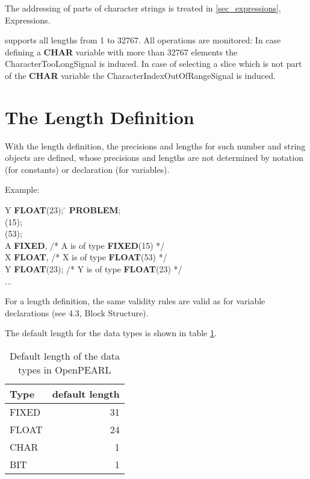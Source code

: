 The addressing of parts of character strings is treated in
 \ref{sec_expressions}, Expressions.

\OpenPEARL{} supports all lengths from 1 to 32767.
All operations are monitored:
In case defining a {\bf CHAR} variable with more than 32767 elements the
CharacterTooLongSignal is induced.
In case of selecting a slice which is not part of the {\bf CHAR} variable the 
CharacterIndexOutOfRangeSignal is induced.

\section{The Length Definition}   %
\label{sec_length}

With the length definition, the precisions and lengths for such
number and string objects are defined, whose precisions and lengths are
not determined by notation (for constants) or declaration (for
variables).


Example:

\begin{tabbing}
\x \x Y {\bf FLOAT}(23); \x \= \kill
{\bf PROBLEM}; \> \\
(15); \> \\
(53); \> \\
 A {\bf FIXED}, \> /* A is of type {\bf FIXED}(15) */ \\
\x \x X {\bf FLOAT},        \> /* X is of type {\bf FLOAT}(53) */ \\
\x \x Y {\bf FLOAT}(23);    \> /* Y is of type {\bf FLOAT}(23) */ \\
\x ... \> \\
\end{tabbing}

For a length definition, the same validity rules are valid as for
variable declarations (see 4.3, Block Structure).

The default length for the data types is shown in table \ref{tab_default_length}.

\begin{table}[bpht]
\begin{center}
\begin{tabular}{|l|r|}
\hline
Type & default length \\
\hline
FIXED & 31 \\
\hline
FLOAT & 24 \\
\hline
CHAR & 1 \\
\hline
BIT & 1 \\
\hline
\end{tabular}
\end{center}
\caption{Default length of the data types in OpenPEARL}
\label{tab_default_length}
\end{table}

